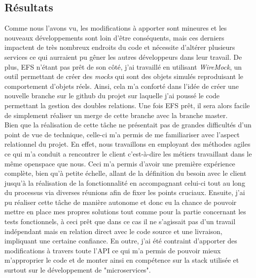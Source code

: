 \subsection{Résultats}

	Comme nous l'avons vu, les modifications à apporter sont mineures et les nouveaux développements sont loin d'être conséquents, mais ces derniers impactent de très nombreux endroits du code et nécessite d'altérer plusieurs services ce qui aurraient pu gêner les autres développeurs dans leur travail. De plus, EFS n'étant pas prêt de son côté, j'ai travaillé en utilisant \textit{WireMock}, un outil permettant de créer des \textit{mocks} qui sont des objets simulés reproduisant le comportement d'objets réels. Ainsi, cela m'a conforté dans l'idée de créer une nouvelle branche sur le github du projet sur laquelle j'ai poussé le code permettant la gestion des doubles relations. Une fois EFS prêt, il sera alors facile de simplement réaliser un merge de cette branche avec la branche master. \\
	
	Bien que la réalisation de cette tâche ne présentait pas de grandes difficultés d'un point de vue de technique, celle-ci m'a permis de me familiariser avec l'aspect relationnel du projet. En effet, nous travaillons en employant des méthodes agiles ce qui m'a conduit a rencontrer le client c'est-à-dire les métiers travaillant dans le même openspace que nous. Ceci m'a permis d'avoir une première expérience complète, bien qu'à petite échelle, allant de la définition du besoin avec le client jusqu'à la réalisation de la fonctionnalité en accompagnant celui-ci tout au long du processus via diverses réunions afin de fixer les points cruciaux. Ensuite, j'ai pu réaliser cette tâche de manière autonome et donc eu la chance de pouvoir mettre en place mes propres solutions tout comme pour la partie concernant les tests fonctionnels, à ceci prêt que dans ce cas il ne s'agissait pas d'un travail indépendant mais en relation direct avec le code source et une livraison, impliquant une certaine confiance.
	En outre, j'ai été contraint d'apporter des modifications à travers toute l'API ce qui m'a permis de pouvoir mieux m'approprier le code et de monter ainsi en compétence sur la stack utilisée et surtout sur le développement de "microservices".